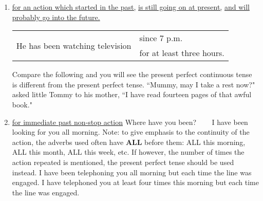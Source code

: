 \begin{enumerate}
    \item \underline{for an action which started in the past,}
        \newline
        \underline{is still going on at present,}
        \newline
        \underline{and will probably go into the future.}
        \newline
        \newline
        \begin{tabular}{ll}
            \multirow{2}{*}{He has been watching television}
            & since 7 p.m. \\
            & for at least three hours.
        \end{tabular}
        \newline
        \newline
        Compare the following and you will see the present perfect continuous
        tense is different from the present perfect tense.
        \newline
        \newline
        ``Mummy, may I take a rest now?" asked little Tommy to his mother,
        ``I have read fourteen pages of that awful book."
    \item \underline{for immediate past non-stop action}
        \newline
        \newline
        Where have you been? ~~~ I have been looking for you all morning.
        \newline
        \newline
        Note: to give emphasis to the continuity of the action, the adverbs used
        often have \textbf{ALL} before them:
        \newline
        \newline
        ALL this morning, ALL this month, ALL this week, etc.
        If however, the number of times the action repeated is mentioned,
        the present perfect tense should be used instead.
        \newline
        \newline
        I have been telephoning you all morning but each time the line was engaged.
        \newline
        \newline
        I have telephoned you at least four times this morning but each time the line was engaged.
\end{enumerate}

